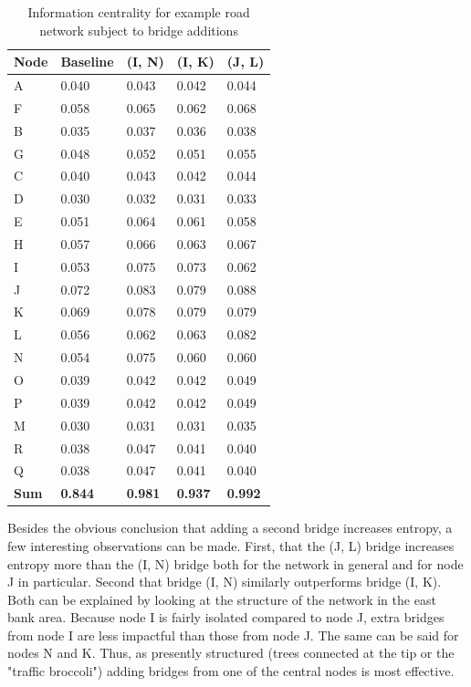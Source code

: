 \begin{table}[H]
	\centering
	\caption{Information centrality for example road network subject to bridge additions}
	\label{tab:bridge_information_centrality}
	\begin{tabular}{|C{.2\linewidth}|C{.2\linewidth}|C{.2\linewidth}|C{.2\linewidth}|C{.2\linewidth}|}
		\hline Node & Baseline & (I, N) & (I, K) & (J, L) \\
		\hline A & 0.040 & 0.043 & 0.042 & 0.044 \\
		\hline F & 0.058 & 0.065 & 0.062 & 0.068 \\
		\hline B & 0.035 & 0.037 & 0.036 & 0.038 \\
		\hline G & 0.048 & 0.052 & 0.051 & 0.055 \\
		\hline C & 0.040 & 0.043 & 0.042 & 0.044 \\
		\hline D & 0.030 & 0.032 & 0.031 & 0.033 \\
		\hline E & 0.051 & 0.064 & 0.061 & 0.058 \\
		\hline H & 0.057 & 0.066 & 0.063 & 0.067 \\
		\hline I & 0.053 & 0.075 & 0.073 & 0.062 \\
		\hline J & 0.072 & 0.083 & 0.079 & 0.088 \\
		\hline K & 0.069 & 0.078 & 0.079 & 0.079 \\
		\hline L & 0.056 & 0.062 & 0.063 & 0.082 \\
		\hline N & 0.054 & 0.075 & 0.060 & 0.060 \\
		\hline O & 0.039 & 0.042 & 0.042 & 0.049 \\
		\hline P & 0.039 & 0.042 & 0.042 & 0.049 \\
		\hline M & 0.030 & 0.031 & 0.031 & 0.035 \\
		\hline R & 0.038 & 0.047 & 0.041 & 0.040 \\
		\hline Q & 0.038 & 0.047 & 0.041 & 0.040 \\
		\hline \textbf{Sum} & \textbf{0.844} & \textbf{0.981} & \textbf{0.937} & \textbf{0.992} \\
		\hline
	\end{tabular}
\end{table}

Besides the obvious conclusion that adding a second bridge increases entropy, a few interesting observations can be made. First, that the (J, L) bridge increases entropy more than the (I, N) bridge both for the network in general and for node J in particular. Second that bridge (I, N) similarly outperforms bridge (I, K). Both can be explained by looking at the structure of the network in the east bank area. Because node I is fairly isolated compared to node J, extra bridges from node I are less impactful than those from node J. The same can be said for nodes N and K. Thus, as presently structured (trees connected at the tip or the "traffic broccoli") adding bridges from one of the central nodes is most effective.